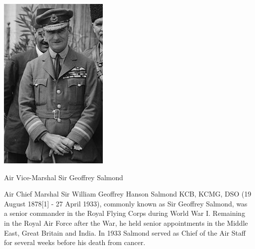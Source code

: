 \documentclass[justified]{tufte-book}
\begin{document}
\begin{marginfigure}
\includegraphics[width=\textwidth]{./graphics/EG/SirGeoffreySalmond}
\caption{Air Vice-Marshal Sir Geoffrey Salmond}
\end{marginfigure}
Air Chief Marshal Sir William Geoffrey Hanson Salmond KCB, KCMG, DSO (19 August 1878[1] - 27 April 1933), commonly known as Sir Geoffrey Salmond, was a senior commander in the Royal Flying Corps during World War I. Remaining in the Royal Air Force after the War, he held senior appointments in the Middle East, Great Britain and India. In 1933 Salmond served as Chief of the Air Staff for several weeks before his death from cancer.
\end{document}
